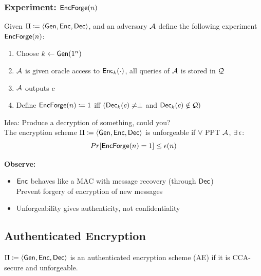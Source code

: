 \documentclass[12pt]{article}
\begin{document}
\subsubsection{Experiment: $\mathsf{EncForge}(n)$}
Given $\Pi \coloneqq \langle \operatorname{\mathsf{Gen}}, \operatorname{\mathsf{Enc}}, \operatorname{\mathsf{Dec}} \rangle$, and an adversary $\mathcal{A}$ define the following experiment $\mathsf{EncForge}(n)$:
\begin{enumerate}
\item Choose $k\leftarrow \operatorname{\mathsf{Gen}}(1^n)$
\item $\mathcal{A}$ is given oracle access to $\operatorname{\mathsf{Enc}}_k(\cdot)$, all queries of $\mathcal{A}$ is stored in $\mathcal{Q}$
\item $\mathcal{A}$ outputs $c$
\item Define $\mathsf{EncForge}(n) \coloneqq 1$ iff $(\operatorname{\mathsf{Dec}}_k(c) \neq \perp$ and $\operatorname{\mathsf{Dec}}_k(c)  \notin \mathcal{Q})$
\end{enumerate}
Idea: Produce a decryption of something, could you?\\
The encryption scheme $\Pi \coloneqq \langle \operatorname{\mathsf{Gen}}, \operatorname{\mathsf{Enc}}, \operatorname{\mathsf{Dec}} \rangle$ is unforgeable if $\forall$ PPT $\mathcal{A}$, $\exists\,\epsilon$:
\begin{equation*}
Pr[\mathsf{EncForge}(n)=1] \le \epsilon(n)
\end{equation*}

\textbf{Observe:}
\begin{itemize}
\item $\operatorname{\mathsf{Enc}}$ behaves like a MAC with message recovery (through $\operatorname{\mathsf{Dec}}$)\\
Prevent forgery of encryption of new messages
\item Unforgeability gives authenticity, not confidentiality
\end{itemize}

\subsection{Authenticated Encryption}
$\Pi \coloneqq \langle \operatorname{\mathsf{Gen}}, \operatorname{\mathsf{Enc}}, \operatorname{\mathsf{Dec}} \rangle$ is an authenticated encryption scheme (AE) if it is CCA-secure and unforgeable.
\newpage
\end{document}
